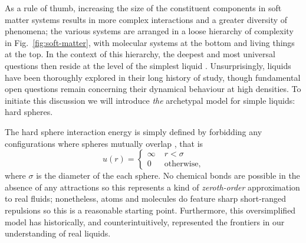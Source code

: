 \documentclass[11pt,twoside]{report}
\begin{document}
As a rule of thumb, increasing the size of the constituent components in soft matter systems results in more complex interactions and a greater diversity of phenomena; the various systems are arranged in a loose hierarchy of complexity in Fig.\ \ref{fig:soft-matter}, with molecular systems at the bottom and living things at the top.
In the context of this hierarchy,
the deepest and most universal questions then reside at the level of the simplest liquid%
.
Unsurprisingly, liquids have been thoroughly explored in their long history of study, though fundamental open questions remain concerning their dynamical behaviour at high densities.
To initiate this discussion we will introduce \emph{the} archetypal model for simple liquids: hard spheres.

The hard sphere interaction energy is simply defined by forbidding any configurations where spheres mutually overlap%
,
that is
\begin{equation}\label{eq:hs-interaction}
  u(r) =
  \begin{cases}
    \infty & \; r < \sigma \\
    0 & \; \textrm{otherwise},
  \end{cases}
\end{equation}
where $\sigma$ is the diameter of the each sphere.
No chemical bonds are possible in the absence of any attractions so this represents a kind of \emph{zeroth-order} approximation to real fluids; nonetheless, atoms and molecules do feature sharp short-ranged repulsions so this is a reasonable starting point.
Furthermore, this oversimplified model has historically, and counterintuitively, represented the frontiers in our understanding of real liquids.
\end{document}
